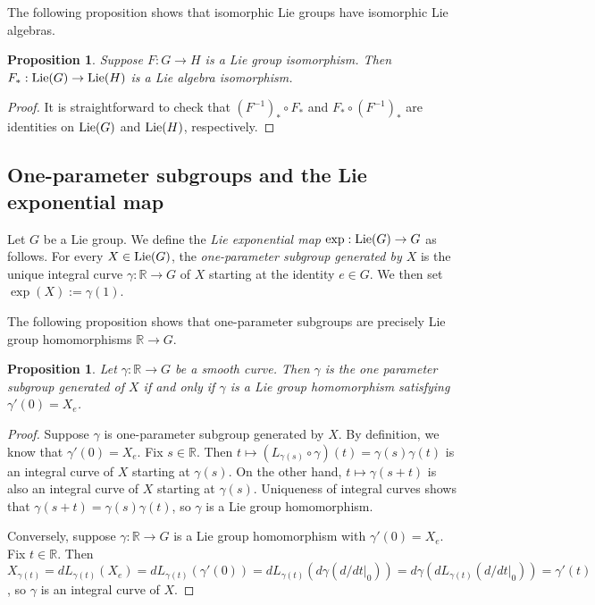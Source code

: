 \documentclass{amsart}
\newcommand{\R}{\mathbb R}
\newcommand{\lie}{\text{\normalfont Lie}}
\theoremstyle{plain}
\newtheorem{proposition}[theorem]{Proposition}
\theoremstyle{definition}
\theoremstyle{remark}
\begin{document}
	The following proposition shows that isomorphic Lie groups have isomorphic Lie algebras.
	\begin{proposition}
		Suppose $F:G \rightarrow H$ is a Lie group isomorphism. Then $F_*:\lie(G) \rightarrow \lie(H)$ is a Lie algebra isomorphism.
	\end{proposition}
	\begin{proof}
		It is straightforward to check that $(F^{-1})_* \circ F_*$ and  $F_* \circ (F^{-1})_*$ are identities on $\lie(G)$ and $\lie(H)$, respectively.
	\end{proof}

	\subsection{One-parameter subgroups and the Lie exponential map}
	Let $G$ be a Lie group. We define the  \emph{Lie exponential map} $\exp:\lie(G)\rightarrow G$ as follows. For every $X \in \lie(G)$, the \emph{one-parameter subgroup generated by $X$} is the unique integral curve $\gamma:\R \rightarrow G$ of $X$ starting at the identity $e \in G$. We then set $\exp(X) := \gamma(1)$.
	
	
	The following proposition shows that one-parameter subgroups are precisely Lie group homomorphisms $\R \rightarrow G$.
	\begin{proposition}
		\label{equivalence one parameter}
		Let $\gamma:\R \rightarrow G$ be a smooth curve. Then $\gamma$ is the one parameter subgroup generated of $X$ if and only if $\gamma$ is a Lie group homomorphism satisfying $\gamma'(0) = X_e$.
	\end{proposition}
	\begin{proof}
		Suppose $\gamma$ is one-parameter subgroup generated by $X$. By definition, we know that  $\gamma'(0) = X_e$. Fix $s \in \R$. Then $t \mapsto (L_{\gamma(s)} \circ \gamma)(t) = \gamma(s) \gamma(t)$ is an integral curve of $X$ starting at $\gamma(s)$. On the other hand, $t \mapsto \gamma(s + t)$ is also an integral curve of $X$ starting at $\gamma(s)$. Uniqueness of integral curves shows that $\gamma(s+t) = \gamma(s) \gamma(t)$, so $\gamma$ is a Lie group homomorphism.
		
		Conversely, suppose $\gamma:\R \rightarrow G$ is a Lie group homomorphism with $\gamma'(0) = X_e$. Fix $t \in \R$. Then $X_{\gamma(t)} = dL_{\gamma(t)}(X_e) = dL_{\gamma(t)}(\gamma'(0)) = dL_{\gamma(t)}(d\gamma(d/dt|_0)) = d\gamma(dL_{\gamma(t)}(d/dt|_0)) = \gamma'(t)$, so $\gamma$ is an integral curve of $X$.
	\end{proof}
	
\end{document}
